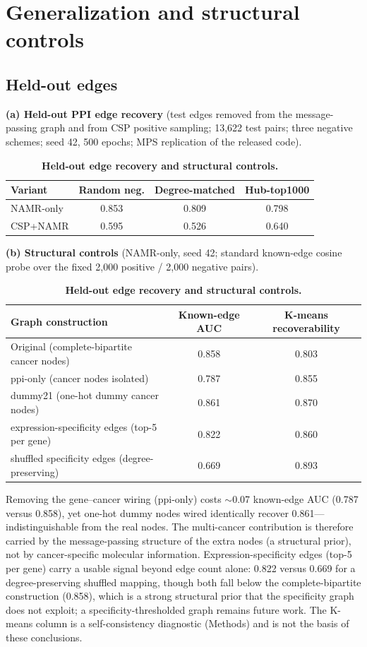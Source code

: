 \documentclass[11pt,a4paper]{article}
\begin{document}
\FloatBarrier


\section{Generalization and structural controls}

\subsection{Held-out edges}

\begin{table}[h]
\centering
\caption{\textbf{Held-out edge recovery and structural controls.}}
\label{tab:s18}
\footnotesize
\textbf{(a) Held-out PPI edge recovery} (test edges removed from the message-passing graph and from CSP positive
sampling; 13,622 test pairs; three negative schemes; seed 42, 500 epochs; MPS replication of the released code).
\begin{tabular}{@{}lccc@{}}
\toprule
\textbf{Variant} & \textbf{Random neg.} & \textbf{Degree-matched} & \textbf{Hub-top1000} \\
\midrule
NAMR-only & 0.853 & 0.809 & 0.798 \\
CSP+NAMR & 0.595 & 0.526 & 0.640 \\
\bottomrule
\end{tabular}

\textbf{(b) Structural controls} (NAMR-only, seed 42; standard known-edge cosine probe over the fixed 2,000 positive /
2,000 negative pairs).
\begin{tabular}{@{}lcc@{}}
\toprule
\textbf{Graph construction} & \textbf{Known-edge AUC} & \textbf{K-means recoverability} \\
\midrule
Original (complete-bipartite cancer nodes) & 0.858 & 0.803 \\
ppi-only (cancer nodes isolated) & 0.787 & 0.855 \\
dummy21 (one-hot dummy cancer nodes) & 0.861 & 0.870 \\
expression-specificity edges (top-5 per gene) & 0.822 & 0.860 \\
shuffled specificity edges (degree-preserving) & 0.669 & 0.893 \\
\bottomrule
\end{tabular}

\noindent Removing the gene--cancer wiring (ppi-only) costs $\sim$0.07 known-edge AUC (0.787 versus 0.858), yet
one-hot dummy nodes wired identically recover 0.861---indistinguishable from the real nodes. The multi-cancer
contribution is therefore carried by the message-passing structure of the extra nodes (a structural prior), not by
cancer-specific molecular information. Expression-specificity edges (top-5 per gene) carry a usable signal beyond
edge count alone: 0.822 versus 0.669 for a degree-preserving shuffled mapping, though both fall below the
complete-bipartite construction (0.858), which is a strong structural prior that the specificity graph does not
exploit; a specificity-thresholded graph remains future work. The K-means column is a self-consistency diagnostic
(Methods) and is not the basis of these conclusions.


\end{table}
\end{document}
